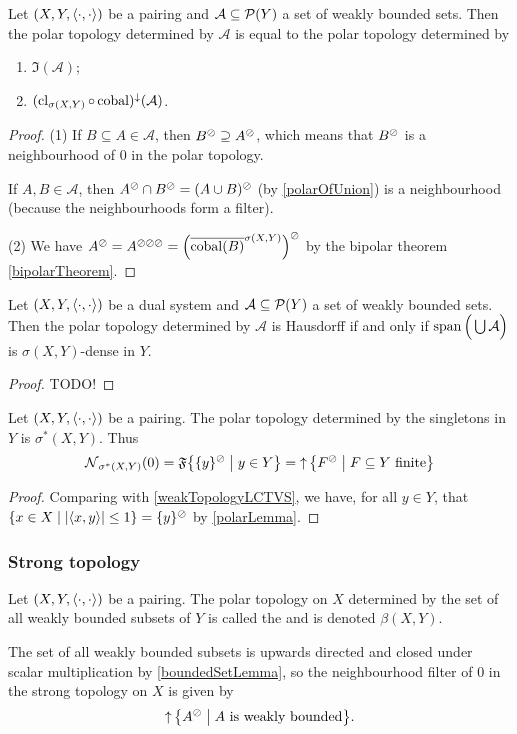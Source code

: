 \begin{lemma}
Let $\left( X,Y,\left\langle \cdot,\cdot \right\rangle \right)$ be a pairing and $\mathcal{A}\subseteq\operatorname{\mathcal{P}}(Y)$ a set of weakly bounded sets. Then the polar topology determined by $\mathcal{A}$ is equal to the polar topology determined by
\begin{enumerate}
\item $\mathfrak{I}(\mathcal{A})$;
\item $(\operatorname{cl}_{\sigma(X,Y)}\circ \operatorname{cobal})^{\downarrow}(\mathcal{A})$.
\end{enumerate}
\end{lemma}
\begin{proof}
(1) If $B\subseteq A\in \mathcal{A}$, then $B^\oslash \supseteq A^\oslash$, which means that $B^\oslash$ is a neighbourhood of $0$ in the polar topology.

If $A,B\in \mathcal{A}$, then $A^\oslash\cap B^\oslash = (A\cup B)^\oslash$ (by \ref{polarOfUnion}) is a neighbourhood (because the neighbourhoods form a filter).

(2) We have $A^\oslash = A^{\oslash\oslash\oslash} = \Big(\overline{\operatorname{cobal}(B)}^{\sigma(X,Y)}\Big)^\oslash$ by the bipolar theorem \ref{bipolarTheorem}.
\end{proof}

\begin{proposition}
Let $\left( X,Y,\left\langle \cdot,\cdot \right\rangle \right)$ be a dual system and  $\mathcal{A}\subseteq\operatorname{\mathcal{P}}(Y)$ a set of weakly bounded sets. Then the polar topology determined by $\mathcal{A}$ is Hausdorff \textup{if and only if} $\operatorname{span}\Big(\bigcup \mathcal{A}\Big)$ is $\sigma(X,Y)$-dense in $Y$.
\end{proposition}
\begin{proof}
TODO!
\end{proof}

\begin{proposition} \label{weak*topologyPolarTopology}
Let $\left( X,Y,\left\langle \cdot,\cdot \right\rangle \right)$ be a pairing. The polar topology determined by the singletons in $Y$ is $\sigma^*(X,Y)$. Thus
\[ \neighbourhood_{\sigma^*(X,Y)}(0) = \mathfrak{F}\setbuilder{\{y\}^\pol}{y\in Y} = \upset\setbuilder{F^\pol}{\text{$F\subseteq Y$ finite}} \]
\end{proposition}
\begin{proof}
Comparing with \ref{weakTopologyLCTVS}, we have, for all $y\in Y$, that $\setbuilder{x\in X}{\abspair{x,y}\leq 1} = \{y\}^\pol$ by \ref{polarLemma}.
\end{proof}

\subsubsection{Strong topology}
\begin{definition}
Let $\left( X,Y,\left\langle \cdot,\cdot \right\rangle \right)$ be a pairing. The polar topology on $X$ determined by the set of all weakly bounded subsets of $Y$ is called the  and is denoted $\beta(X,Y)$.
\end{definition}
The set of all weakly bounded subsets is upwards directed and closed under scalar multiplication by \ref{boundedSetLemma}, so the neighbourhood filter of $0$ in the strong topology on $X$ is given by
\[ \upset\setbuilder{A^\pol}{\text{$A$ is weakly bounded}}. \]

